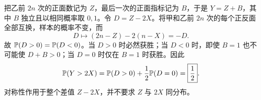 把乙前 $2n$ 次的正面数记为 $Z$，最后一次的正面指标记为 $B$，于是 $Y=Z+B$，其中 $B$ 独立且以相同概率取 $0,1$。令 $D=Z-2X$。将甲和乙前 $2n$ 次的每个正反面全部互换，样本的概率不变，而
\[
D\longmapsto(2n-Z)-2(n-X)=-D.
\]
故 $\mathbb{P}(D>0)=\mathbb{P}(D<0)$。当 $D>0$ 时必然获胜；当 $D<0$ 时，即使 $B=1$ 也不可能使 $D+B>0$；当 $D=0$ 时仅在 $B=1$ 时获胜。因此
\[
\mathbb{P}(Y>2X)=\mathbb{P}(D>0)+\frac12\mathbb{P}(D=0)
=\boxed{\frac12}.
\]
对称性作用于整个差值 $Z-2X$，并不要求 $Z$ 与 $2X$ 同分布。
